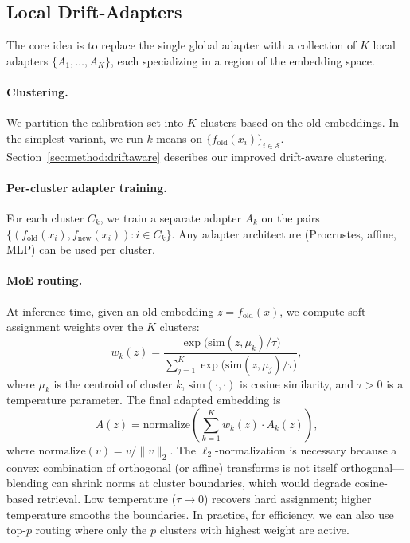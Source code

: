 \documentclass[11pt,a4paper]{article}
\newcommand{\fold}{f_{\mathrm{old}}}
\newcommand{\fnew}{f_{\mathrm{new}}}
\begin{document}
\subsection{Local Drift-Adapters}
\label{sec:method:local}

The core idea is to replace the single global adapter with a collection of $K$ local adapters $\{A_1, \ldots, A_K\}$, each specializing in a region of the embedding space.

\paragraph{Clustering.}
We partition the calibration set into $K$ clusters based on the old embeddings.
In the simplest variant, we run $k$-means on $\{\fold(x_i)\}_{i \in \mathcal{S}}$.
Section~\ref{sec:method:driftaware} describes our improved drift-aware clustering.

\paragraph{Per-cluster adapter training.}
For each cluster $C_k$, we train a separate adapter $A_k$ on the pairs $\{(\fold(x_i), \fnew(x_i)) : i \in C_k\}$.
Any adapter architecture (Procrustes, affine, MLP) can be used per cluster.

\paragraph{MoE routing.}
At inference time, given an old embedding $z = \fold(x)$, we compute soft assignment weights over the $K$ clusters:
\begin{equation}
  w_k(z) = \frac{\exp\bigl(\mathrm{sim}(z, \mu_k) / \tau\bigr)}{\sum_{j=1}^{K} \exp\bigl(\mathrm{sim}(z, \mu_j) / \tau\bigr)},
  \label{eq:routing}
\end{equation}
where $\mu_k$ is the centroid of cluster $k$, $\mathrm{sim}(\cdot, \cdot)$ is cosine similarity, and $\tau > 0$ is a temperature parameter.
The final adapted embedding is
\begin{equation}
  A(z) = \mathrm{normalize}\!\left(\sum_{k=1}^{K} w_k(z) \cdot A_k(z)\right),
  \label{eq:moe}
\end{equation}
where $\mathrm{normalize}(v) = v / \|v\|_2$.
The $\ell_2$-normalization is necessary because a convex combination of orthogonal (or affine) transforms is not itself orthogonal---blending can shrink norms at cluster boundaries, which would degrade cosine-based retrieval.
Low temperature ($\tau \to 0$) recovers hard assignment; higher temperature smooths the boundaries.
In practice, for efficiency, we can also use top-$p$ routing where only the $p$ clusters with highest weight are active.
\end{document}
